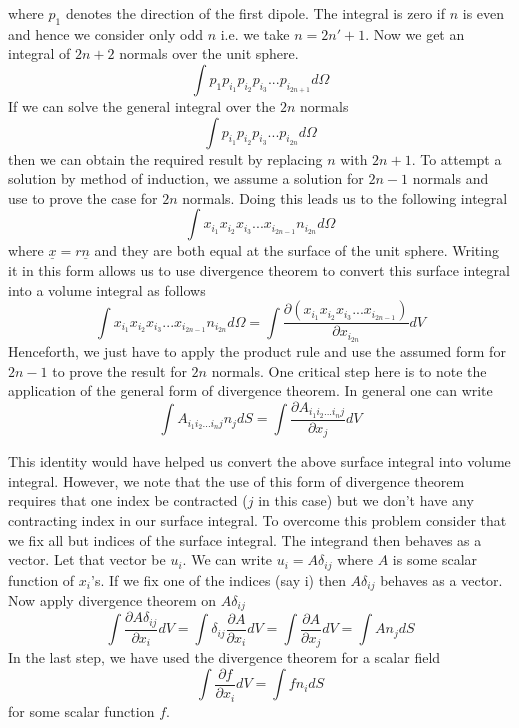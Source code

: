 \documentclass[11pt, letterpaper]{article}
\newcommand{\dij}{\delta_{ij}}
\newcommand{\1}{\bm{1}}
\newcommand{\pd}[2]{\frac{\partial #1}{\partial #2}}
\newcommand{\un}[1]{\underline{#1}}
\begin{document}
where $p_1$ denotes the direction of the first dipole. The integral is zero if $n$ is even and hence we consider only odd $n$ i.e. we take $n = 2n'+1$. Now we get an integral of $2n+2$ normals over the unit sphere. 
$$
\int p_1 p_{i_1} p_{i_2} p_{i_3}...p_{i_{2n+1}} d\Omega
$$
If we can solve the general integral over the $2n$ normals
$$
\int p_{i_1} p_{i_2} p_{i_3}...p_{i_{2n}} d\Omega
$$
then we can obtain the required result by replacing $n$ with $2n+1$. To attempt a solution by method of induction, we assume a solution for $2n-1$ normals and use to prove the case for $2n$ normals. Doing this leads us to the following integral
$$
\int x_{i_1} x_{i_2} x_{i_3}...x_{i_{2n-1}} n_{i_{2n}} d\Omega
$$
where $\un{x}=r\un{n}$ and they are both equal at the surface of the unit sphere. Writing it in this form allows us to use divergence theorem to convert this surface integral into a volume integral as follows
$$
\int x_{i_1} x_{i_2} x_{i_3}...x_{i_{2n-1}} n_{i_{2n}} d\Omega = \int \pd{(x_{i_1} x_{i_2} x_{i_3}...x_{i_{2n-1}})}{x_{i_{2n}}} dV
$$
Henceforth, we just have to apply the product rule and use the assumed form for $2n-1$ to prove the result for $2n$ normals. One critical step here is to note the application of the general form of divergence theorem. In general one can write
$$
\int A_{i_1 i_2...i_n j}n_j dS = \int \pd{A_{i_1 i_2...i_n j}}{x_j}dV 
$$

This identity would have helped us convert the above surface integral into volume integral. However, we note that the use of this form of divergence theorem requires that one index be contracted ($j$ in this case) but we don't have any contracting index in our surface integral. To overcome this problem consider that we fix all but indices of the surface integral. The integrand then behaves as a vector. Let that vector be $u_i$. We can write $u_i = A\dij$ where $A$ is some scalar function of $x_i$'s. If we fix one of the indices (say i) then $A\dij$ behaves as a vector. Now apply divergence theorem on $A\dij$
$$
\int \pd{A\dij}{x_i} dV = \int \dij \pd{A}{x_i} dV = \int \pd{A}{x_j} dV = \int A n_j dS
$$
In the last step, we have used the divergence theorem for a scalar field 
$$
\int \pd{f}{x_i} dV = \int f n_i dS
$$
for some scalar function $f$.
\end{document}

